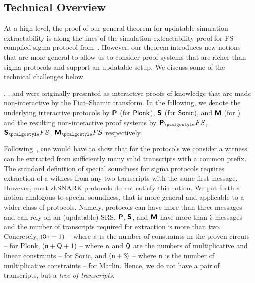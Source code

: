 \subsection{Technical Overview}

At a high level, the proof of our general theorem for updatable simulation
extractability is along the lines of the simulation extractability proof for
FS-compiled sigma protocol from~\cite{INDOCRYPT:FKMV12}. However, our theorem
introduces new notions that are more general to allow us to consider proof
systems that are richer than sigma protocols and support an updatable setup. We
discuss some of the technical challenges below.

\plonk{}, \sonic{}, and \marlin{} were originally presented as interactive
proofs of knowledge that are made non-interactive by the Fiat--Shamir transform.
In the following, we denote the underlying interactive protocols by $\bm{\mathsf{P}}$
(for $\textnormal{\textsf{Plonk}}$), $\bm{\mathsf{S}}$ (for ${\textnormal{\textsf{Sonic}}}$), and $\bm{\mathsf{M}}$ (for \marlin) and
the resulting non-interactive proof systems by $\plonkprotfs$, $\sonicprotfs$,
$\marlinprotfs$ respectively.

Following~\cite{INDOCRYPT:FKMV12}, one would have to show that for the protocols
we consider a witness can be extracted from sufficiently many valid transcripts
with a common prefix. The standard definition of special soundness for sigma
protocols requires extraction of a witness from any two transcripts with the
same first message. However, most zkSNARK protocols do not satisfy this notion.
We put forth a notion analogous to special soundness, that is more general and
applicable to a wider class of protocols. Namely, protocols can have more than three
messages and can rely on an (updatable) SRS. $\bm{\mathsf{P}}$, $\bm{\mathsf{S}}$, and
$\bm{\mathsf{M}}$ have more than 3 messages and the number of transcripts required for extraction is more
than two. Concretely, $(3 \mathsf{n} + 1)$ -- where $\mathsf{n}$ is the number of
constraints in the proven circuit -- for Plonk, $(\mathsf{n} + \mathsf{Q} + 1)$
-- where $\mathsf{n}$ and $\mathsf{Q}$ are the numbers of multiplicative and
linear constraints -- for Sonic, and $(\mathsf{n} + 3)$ -- where $\mathsf{n}$
is the number of multiplicative constraints -- for Marlin. Hence, we do not have
a pair of transcripts, but a \emph{tree of transcripts}.

